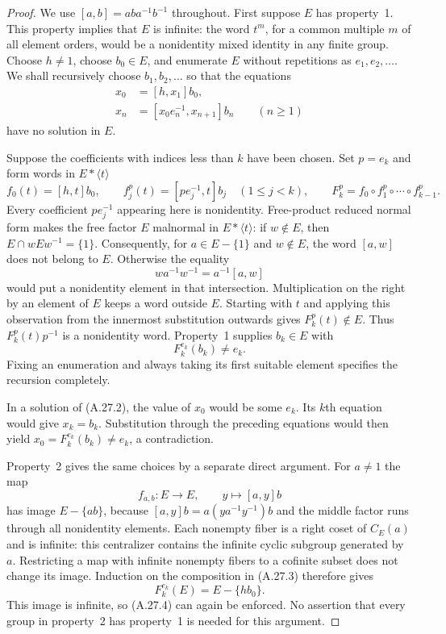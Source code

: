 \begin{proof}
We use $[a,b]=aba^{-1}b^{-1}$ throughout. First suppose $E$
has property~1. This property implies that $E$ is infinite:
the word $t^m$, for a common multiple $m$ of all element orders,
would be a nonidentity mixed identity in any finite group.
Choose $h\ne1$, choose $b_0\in E$, and enumerate $E$ without
repetitions as $e_1,e_2,\ldots$. We shall recursively choose
$b_1,b_2,\ldots$ so that the equations
\[
 \begin{split}
 x_0&=[h,x_1]b_0,\\
 x_n&=[x_0e_n^{-1},x_{n+1}]b_n\qquad(n\geq1)
 \end{split}
 \tag{A.27.2}
\]
have no solution in $E$.

Suppose the coefficients with indices less than $k$ have been
chosen. Set $p=e_k$ and form words in $E*\langle t\rangle$
\[
 f_0(t)=[h,t]b_0,\qquad
 f_j^p(t)=[pe_j^{-1},t]b_j\quad(1\leq j<k),
 \qquad
 F_k^p=f_0\circ f_1^p\circ\cdots\circ f_{k-1}^p.
 \tag{A.27.3}
\]
Every coefficient $pe_j^{-1}$ appearing here is nonidentity.
Free-product reduced normal form makes the free factor $E$
malnormal in $E*\langle t\rangle$: if $w\notin E$, then
$E\cap wEw^{-1}=\{1\}$. Consequently, for $a\in E-\{1\}$
and $w\notin E$, the word $[a,w]$ does not belong to $E$.
Otherwise the equality
\[
 wa^{-1}w^{-1}=a^{-1}[a,w]
\]
would put a nonidentity element in that intersection.
Multiplication on the right by an element of $E$ keeps a word
outside $E$. Starting with $t$ and applying this observation
from the innermost substitution outwards gives $F_k^p(t)\notin E$.
Thus $F_k^p(t)p^{-1}$ is a nonidentity word. Property~1 supplies
$b_k\in E$ with
\[
 F_k^{e_k}(b_k)\ne e_k.
 \tag{A.27.4}
\]
Fixing an enumeration and always taking its first suitable
element specifies the recursion completely.

In a solution of (A.27.2), the value of $x_0$ would be some
$e_k$. Its $k$th equation would give $x_k=b_k$. Substitution
through the preceding equations would then yield
$x_0=F_k^{e_k}(b_k)\ne e_k$, a contradiction.

Property~2 gives the same choices by a separate direct argument.
For $a\ne1$ the map
\[
 f_{a,b}:E\longrightarrow E,\qquad y\longmapsto[a,y]b
 \tag{A.27.5}
\]
has image $E-\{ab\}$, because
$[a,y]b=a(ya^{-1}y^{-1})b$ and the middle factor runs through
all nonidentity elements. Each nonempty fiber is a right coset
of $C_E(a)$ and is infinite: this centralizer contains the
infinite cyclic subgroup generated by $a$. Restricting a map
with infinite nonempty fibers to a cofinite subset does not
change its image. Induction on the composition in (A.27.3)
therefore gives
\[
 F_k^{e_k}(E)=E-\{hb_0\}.
 \tag{A.27.6}
\]
This image is infinite, so (A.27.4) can again be enforced.
No assertion that every group in property~2 has property~1 is
needed for this argument.


\end{proof}
